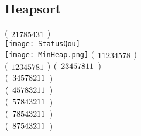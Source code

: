\documentclass{article}
\begin{document}
	\subsection*{Heapsort}
	$
	(\begin{array}{c}
	2 1 7 8 5 4 3 1
	\end{array}
	$) \\
	\texttt{[image: StatusQou]} \\
	\texttt{[image: MinHeap.png]}
	$
	(\begin{array}{c}
	1 1 2 3 4 5 7 8
	\end{array}
	$) \\
	$
	(\begin{array}{c}
	1 2 3 4 5 7 8 1
	\end{array}
	$) 
	$\\
	(\begin{array}{c}
	2 3 4 5 7 8 1 1 
	\end{array}
	$) \\
	$\\
	(\begin{array}{c}
	3 4 5 7 8 2 1 1 
	\end{array}
	$) \\
	$\\
	(\begin{array}{c}
	4 5 7 8 3 2 1 1 
	\end{array}
	$) \\
	$\\
	(\begin{array}{c}
	5 7 8 4 3 2 1 1 
	\end{array}
	$) \\
	$\\
	(\begin{array}{c}
	7 8 5 4 3 2 1 1 
	\end{array}
	$) \\
	$\\
	(\begin{array}{c}
	8 7 5 4 3 2 1 1 
	\end{array}
	$) \\
\end{document}
